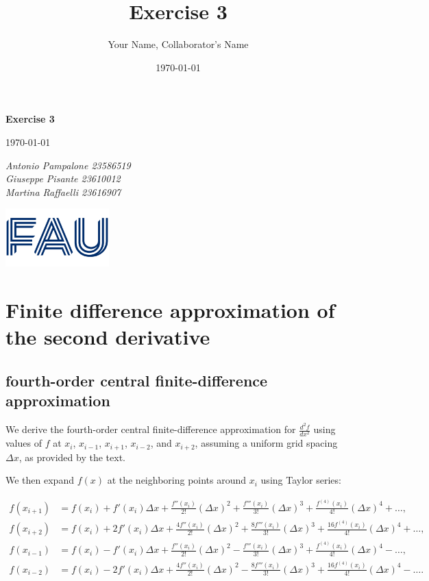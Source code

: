 \documentclass{article}
\title{Exercise 3}
\author{Your Name, Collaborator's Name}
\date{\today}
\begin{document}
\begin{titlepage}
    \centering
    \vspace*{1in}
    
    {\Huge\bfseries Exercise 3\par}
    \vspace{1.5cm}
    {\Large \today\par}
    \vspace{1.5cm}
    {\Large\itshape Antonio Pampalone 23586519 \\ Giuseppe Pisante 23610012\\ Martina Raffaelli 23616907 \par}
    
    \vfill
    \includegraphics[width=0.3\textwidth]{FAU-Logo.png}\par\vspace{1cm} %
   
\end{titlepage}

\newpage
\small
\section{Finite difference approximation of the second derivative}
\subsection{fourth-order central finite-difference approximation}
We derive the fourth-order central finite-difference approximation for \( \frac{d^2f}{dx^2} \) using values of \( f \) at \( x_i \), \( x_{i-1} \), \( x_{i+1} \), \( x_{i-2} \), and \( x_{i+2} \), assuming a uniform grid spacing \( \Delta x \), as provided by the text.

We then expand \( f(x) \) at the neighboring points around \( x_i \) using Taylor series:

\begin{align*}
f(x_{i+1}) &= f(x_i) + f'(x_i)\Delta x + \frac{f''(x_i)}{2!}(\Delta x)^2 + \frac{f'''(x_i)}{3!}(\Delta x)^3 + \frac{f^{(4)}(x_i)}{4!}(\Delta x)^4 + \dots, \\
f(x_{i+2}) &= f(x_i) + 2f'(x_i)\Delta x + \frac{4f''(x_i)}{2!}(\Delta x)^2 + \frac{8f'''(x_i)}{3!}(\Delta x)^3 + \frac{16f^{(4)}(x_i)}{4!}(\Delta x)^4 + \dots, \\
f(x_{i-1}) &= f(x_i) - f'(x_i)\Delta x + \frac{f''(x_i)}{2!}(\Delta x)^2 - \frac{f'''(x_i)}{3!}(\Delta x)^3 + \frac{f^{(4)}(x_i)}{4!}(\Delta x)^4 - \dots, \\
f(x_{i-2}) &= f(x_i) - 2f'(x_i)\Delta x + \frac{4f''(x_i)}{2!}(\Delta x)^2 - \frac{8f'''(x_i)}{3!}(\Delta x)^3 + \frac{16f^{(4)}(x_i)}{4!}(\Delta x)^4 - \dots.
\end{align*}
\end{document}
